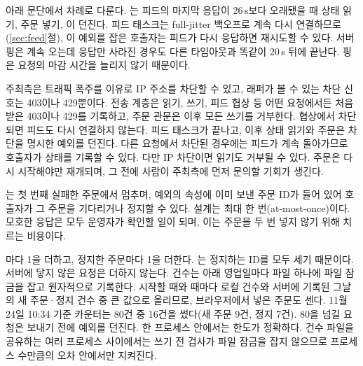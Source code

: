 

\par{}

 아래 문단에서 차례로 다룬다. 는 피드의 마지막 응답이 26\,s보다 오래됐을 때 상태 읽기, 주문 넣기, 이 던진다. 피드 태스크는 full-jitter 백오프로 계속 다시 연결하므로(\ref{sec:feed}절), 이 예외를 잡은 호출자는 피드가 다시 응답하면 재시도할 수 있다. 서버 핑은 계속 오는데 응답만 사라진 경우도 다른 타임아웃과 똑같이 20\,s 뒤에 끝난다. 핑은 요청의 마감 시간을 늘리지 않기 때문이다.

 주최측은 트래픽 폭주를 이유로 IP 주소를 차단할 수 있고, 래퍼가 볼 수 있는 차단 신호는 403이나 429뿐이다. 전송 계층은 읽기, 쓰기, 피드 협상 등 어떤 요청에서든 처음 받은 403이나 429를 기록하고, 주문 관문은 이후 모든 쓰기를 거부한다. 협상에서 차단되면 피드도 다시 연결하지 않는다. 피드 태스크가 끝나고, 이후 상태 읽기와 주문은 차단을 명시한 예외를 던진다. 다른 요청에서 차단된 경우에는 피드가 계속 돌아가므로 호출자가 상태를 기록할 수 있다. 다만 IP 차단이면 읽기도 거부될 수 있다. 주문은 다시 시작해야만 재개되며, 그 전에 사람이 주최측에 먼저 문의할 기회가 생긴다.

 는 첫 번째 실패한 주문에서 멈추며, 예외의  속성에 이미 보낸 주문 ID가 들어 있어 호출자가 그 주문을 기다리거나 정지할 수 있다. 설계는 최대 한 번(at-most-once)이다. 모호한 응답은 모두 운영자가 확인할 일이 되며, 이는 주문을 두 번 넣지 않기 위해 치르는 비용이다.

 마다 1을 더하고, 정지한 주문마다 1을 더한다. 는 정지하는 ID를 모두 세기 때문이다. 서버에 닿지 않은 요청은 더하지 않는다. 건수는 \allowbreak{} 아래 영업일마다 파일 하나에 파일 잠금을 잡고 원자적으로 기록한다. 시작할 때와  때마다 로컬 건수와 서버에 기록된 그날의 새 주문·정지 건수 중 큰 값으로 올리므로, 브라우저에서 넣은 주문도 센다. 11월 24일 10:34 기준 카운터는 80건 중 16건을 썼다(새 주문 9건, 정지 7건). 80을 넘길 요청은 보내기 전에 예외를 던진다. 한 프로세스 안에서는 한도가 정확하다. 건수 파일을 공유하는 여러 프로세스 사이에서는 쓰기 전 검사가 파일 잠금을 잡지 않으므로 프로세스 수만큼의 오차 안에서만 지켜진다.

